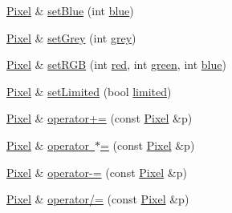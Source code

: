 \begin{DoxyCompactItemize}
\item 
\mbox{\hyperlink{class_pixel}{Pixel}} \& \mbox{\hyperlink{class_pixel_a3e2e996b337f3ae3e2dcbb748c91abad}{set\+Blue}} (int \mbox{\hyperlink{class_pixel_a2df4c0422c0bfe60e03bbc3496ea6618}{blue}})
\item 
\mbox{\hyperlink{class_pixel}{Pixel}} \& \mbox{\hyperlink{class_pixel_af37bcc9005e4e4ec116da879a9669d9d}{set\+Grey}} (int \mbox{\hyperlink{class_pixel_ae9b03b6a253f0ba344a7bfaa8d4a17f6}{grey}})
\item 
\mbox{\hyperlink{class_pixel}{Pixel}} \& \mbox{\hyperlink{class_pixel_a953bc04f4ab0ec1ec2b89a2be8859578}{set\+R\+GB}} (int \mbox{\hyperlink{class_pixel_a29d67107325086ef34118afb5dcf440a}{red}}, int \mbox{\hyperlink{class_pixel_a7febfbcec6e4ed1a31e86a78fc493fcf}{green}}, int \mbox{\hyperlink{class_pixel_a2df4c0422c0bfe60e03bbc3496ea6618}{blue}})
\item 
\mbox{\hyperlink{class_pixel}{Pixel}} \& \mbox{\hyperlink{class_pixel_a21fcbb0bfec7e485750e41da09737f28}{set\+Limited}} (bool \mbox{\hyperlink{class_pixel_a95cb63613222cda3c462a350540bcbc0}{limited}})
\item 
\mbox{\hyperlink{class_pixel}{Pixel}} \& \mbox{\hyperlink{class_pixel_a2d175c56e5761b25bb6a6606ec09b4fa}{operator+=}} (const \mbox{\hyperlink{class_pixel}{Pixel}} \&p)
\item 
\mbox{\hyperlink{class_pixel}{Pixel}} \& \mbox{\hyperlink{class_pixel_ab5a1862968e581e773aa468f425693c0}{operator $\ast$=}} (const \mbox{\hyperlink{class_pixel}{Pixel}} \&p)
\item 
\mbox{\hyperlink{class_pixel}{Pixel}} \& \mbox{\hyperlink{class_pixel_ae535886736ebe3cb2418448d554c57fa}{operator-\/=}} (const \mbox{\hyperlink{class_pixel}{Pixel}} \&p)
\item 
\mbox{\hyperlink{class_pixel}{Pixel}} \& \mbox{\hyperlink{class_pixel_a81f936249561d59938b02e3ab47396c0}{operator/=}} (const \mbox{\hyperlink{class_pixel}{Pixel}} \&p)
\end{DoxyCompactItemize}

